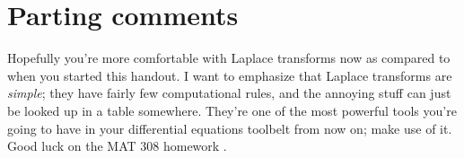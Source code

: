 \documentclass[11pt]{article}
\theoremstyle{mystyle}
\begin{document}
\section{Parting comments}

Hopefully you're more comfortable with Laplace
transforms now as compared to when you started
this handout. I want to emphasize that Laplace
transforms are \emph{simple}; they have fairly
few computational rules, and the annoying stuff
can just be looked up in a table somewhere.
They're one of the most powerful tools you're
going to have in your differential equations
toolbelt from now on; make use of it.
Good luck on the MAT 308 homework \salute.
\end{document}
